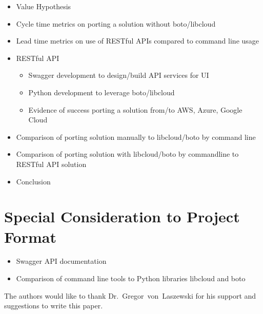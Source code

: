 \begin{itemize}
\item
  Value Hypothesis
\item
  Cycle time metrics on porting a solution without boto/libcloud
\item
  Lead time metrics on use of RESTful APIs compared to command line
  usage
\item
  RESTful API

  \begin{itemize}
    \item
    Swagger development to design/build API services for UI
  \item
    Python development to leverage boto/libcloud
  \item
    Evidence of success porting a solution from/to AWS, Azure, Google
    Cloud
  \end{itemize}
\item
  Comparison of porting solution manually to libcloud/boto by command
  line
\item
  Comparison of porting solution with libcloud/boto by commandline to
  RESTful API solution
\item
  Conclusion
\end{itemize}

\hypertarget{special-consideration-to-project-format}{%
\section{Special Consideration to Project
Format}\label{special-consideration-to-project-format}}

\begin{itemize}
\item
  Swagger API documentation
\item
  Comparison of command line tools to Python libraries libcloud and boto
\end{itemize}

\begin{acks}

  The authors would like to thank Dr.~Gregor~von~Laszewski for his
  support and suggestions to write this paper.

\end{acks}


 

